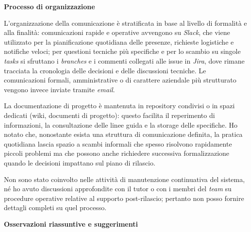 \medskip
\noindent\textbf{Processo di organizzazione}

L’organizzazione della comunicazione è stratificata in base al livello di formalità e alla finalità: 
comunicazioni rapide e operative avvengono su \emph{Slack}, che viene utilizzato per la pianificazione quotidiana delle presenze, richieste logistiche e notifiche veloci; 
per questioni tecniche più specifiche e per lo scambio su singole \emph{tasks} si sfruttano i \emph{branches} e i commenti collegati alle issue in \emph{Jira}, 
dove rimane tracciata la cronologia delle decisioni e delle discussioni tecniche. Le comunicazioni formali, amministrative o di carattere aziendale più strutturato vengono invece inviate tramite \emph{email}.

La documentazione di progetto è mantenuta in repository condivisi o in spazi dedicati (wiki, documenti di progetto): 
questo facilita il reperimento di informazioni, la consultazione delle linee guida e la storage delle specifiche. 
Ho notato che, nonostante esista una struttura di comunicazione definita, la pratica quotidiana lascia spazio a scambi informali che spesso risolvono rapidamente piccoli 
problemi ma che possono anche richiedere successiva formalizzazione quando le decisioni impattano sul piano di rilascio.

Non sono stato coinvolto nelle attività di manutenzione continuativa del sistema, né ho avuto discussioni approfondite con il tutor o con i membri del \emph{team} su procedure 
operative relative al supporto post-rilascio; pertanto non posso fornire dettagli completi su quel processo.

\medskip
\noindent\textbf{Osservazioni riassuntive e suggerimenti}


